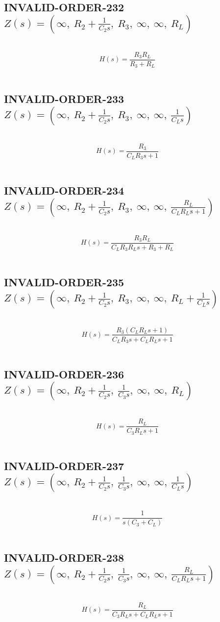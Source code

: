 \documentclass{article}
\begin{document}
\subsection{INVALID-ORDER-232 $Z(s) = \left( \infty, \  R_{2} + \frac{1}{C_{2} s}, \  R_{3}, \  \infty, \  \infty, \  R_{L}\right)$ } \ 
\textbf{\[H(s) = \frac{R_{3} R_{L}}{R_{3} + R_{L}}\] } \ 
\subsection{INVALID-ORDER-233 $Z(s) = \left( \infty, \  R_{2} + \frac{1}{C_{2} s}, \  R_{3}, \  \infty, \  \infty, \  \frac{1}{C_{L} s}\right)$ } \ 
\textbf{\[H(s) = \frac{R_{3}}{C_{L} R_{3} s + 1}\] } \ 
\subsection{INVALID-ORDER-234 $Z(s) = \left( \infty, \  R_{2} + \frac{1}{C_{2} s}, \  R_{3}, \  \infty, \  \infty, \  \frac{R_{L}}{C_{L} R_{L} s + 1}\right)$ } \ 
\textbf{\[H(s) = \frac{R_{3} R_{L}}{C_{L} R_{3} R_{L} s + R_{3} + R_{L}}\] } \ 
\subsection{INVALID-ORDER-235 $Z(s) = \left( \infty, \  R_{2} + \frac{1}{C_{2} s}, \  R_{3}, \  \infty, \  \infty, \  R_{L} + \frac{1}{C_{L} s}\right)$ } \ 
\textbf{\[H(s) = \frac{R_{3} \left(C_{L} R_{L} s + 1\right)}{C_{L} R_{3} s + C_{L} R_{L} s + 1}\] } \ 
\subsection{INVALID-ORDER-236 $Z(s) = \left( \infty, \  R_{2} + \frac{1}{C_{2} s}, \  \frac{1}{C_{3} s}, \  \infty, \  \infty, \  R_{L}\right)$ } \ 
\textbf{\[H(s) = \frac{R_{L}}{C_{3} R_{L} s + 1}\] } \ 
\subsection{INVALID-ORDER-237 $Z(s) = \left( \infty, \  R_{2} + \frac{1}{C_{2} s}, \  \frac{1}{C_{3} s}, \  \infty, \  \infty, \  \frac{1}{C_{L} s}\right)$ } \ 
\textbf{\[H(s) = \frac{1}{s \left(C_{3} + C_{L}\right)}\] } \ 
\subsection{INVALID-ORDER-238 $Z(s) = \left( \infty, \  R_{2} + \frac{1}{C_{2} s}, \  \frac{1}{C_{3} s}, \  \infty, \  \infty, \  \frac{R_{L}}{C_{L} R_{L} s + 1}\right)$ } \ 
\textbf{\[H(s) = \frac{R_{L}}{C_{3} R_{L} s + C_{L} R_{L} s + 1}\] } \ 
\end{document}
